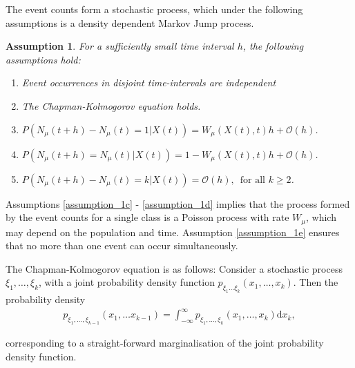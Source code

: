 \documentclass[10pt,a4paper]{article}
\newtheorem{assumption}{Assumption}
\begin{document}
The event counts form a stochastic process, which under the following assumptions is a density dependent Markov Jump process.

\begin{assumption} For a sufficiently small time interval $h$, the following assumptions hold:
	\begin{enumerate}
		\item Event occurrences in disjoint time-intervals are independent \label{assumption_1a}

		\item The Chapman-Kolmogorov equation \cite{Kolmogoroff1931,Feller1940} holds.  \label{assumption_1b}

		\item $P\left( N_{\mu} \left( t  + h \right)  - N_{\mu} \left( t \right) = 1 | X\left( t \right) \right) = W_{\mu} \left( X \left( t\right), t \right) h + \mathcal{O} \left( h \right)$. \label{assumption_1c}
	
		\item $P\left( N_{\mu}\left( t+h\right) = N_{\mu} \left( t \right) | X\left( t \right) \right) = 1-W_{\mu}\left( X \left( t \right) ,t \right) h + \mathcal{O}\left( h \right)$. \label{assumption_1d}

		\item $P\left( N_{\mu}\left( t + h \right ) - N_{\mu} \left( t \right) = k | X\left( t \right) \right)= \mathcal{O}\left( h \right) , \, \textrm{ for all } k \geq 2$. \label{assumption_1e}
	\end{enumerate}
\end{assumption} \label{assumption_1}

Assumptions \ref{assumption_1c} - \ref{assumption_1d} implies that the process formed by the event counts for a single class is a Poisson process with rate $W_{\mu}$, which may depend on the population and time. Assumption \ref{assumption_1e} ensures that no more than one event can occur simultaneously.

The Chapman-Kolmogorov equation is as follows: Consider a stochastic process $\xi_1, \ldots, \xi_k$, with a joint probability density function $p_{\xi_1 \ldots \xi_k} \left( x_1, \ldots, x_k \right)$. Then the probability density
\begin{align*}
p_{\xi_1, \ldots, \xi_ {k-1}} \left( x_1, \ldots x_{k-1} \right) = \int_{-\infty}^\infty p_{\xi_1, \ldots, \xi_k}\left( x_1, \ldots, x_k \right) \mathrm{d} x_k,
\end{align*}

corresponding to a straight-forward marginalisation of the joint probability density function.
\end{document}
